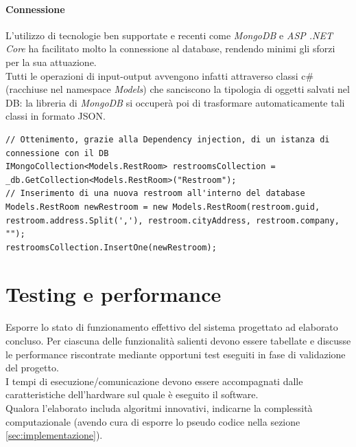 \documentclass[12pt]{article}
\begin{document}
\paragraph{Connessione}
L'utilizzo di tecnologie ben supportate e recenti come \textit{MongoDB} e \textit{ASP .NET Core} ha facilitato molto la connessione al database, rendendo minimi gli sforzi per la sua attuazione.\\
Tutti le operazioni di input-output avvengono infatti attraverso classi c\# (racchiuse nel namespace \textit{Models}) che sanciscono la tipologia di oggetti salvati nel DB: la libreria di \textit{MongoDB} si occuperà poi di trasformare automaticamente tali classi in formato JSON.

\begin{lstlisting}
// Ottenimento, grazie alla Dependency injection, di un istanza di connessione con il DB
IMongoCollection<Models.RestRoom> restroomsCollection = _db.GetCollection<Models.RestRoom>("Restroom");
// Inserimento di una nuova restroom all'interno del database
Models.RestRoom newRestroom = new Models.RestRoom(restroom.guid, restroom.address.Split(','), restroom.cityAddress, restroom.company, "");
restroomsCollection.InsertOne(newRestroom);

\end{lstlisting}
\newpage

\section{Testing e performance}

Esporre lo stato di funzionamento effettivo del sistema progettato ad elaborato concluso. Per ciascuna delle funzionalità salienti devono essere tabellate e discusse le performance riscontrate mediante opportuni test eseguiti in fase di validazione del progetto.\\

I tempi di esecuzione/comunicazione devono essere accompagnati dalle caratteristiche dell'hardware sul quale è eseguito il software.\\

Qualora l'elaborato includa algoritmi innovativi, indicarne la complessità computazionale (avendo cura di esporre lo pseudo codice nella sezione \ref{sec:implementazione}).\\
\end{document}
